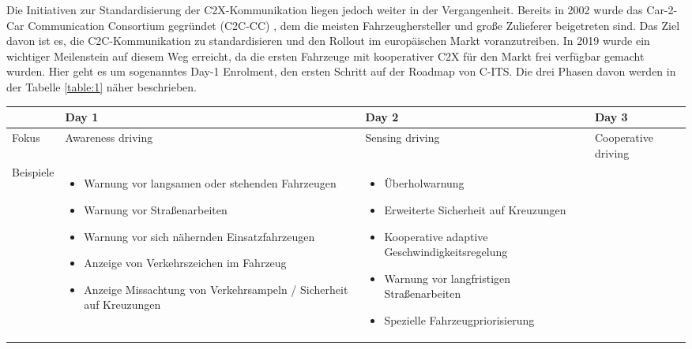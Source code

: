 Die Initiativen zur Standardisierung der C2X-Kommunikation liegen jedoch weiter in der Vergangenheit. Bereits in 2002 wurde das Car-2-Car Communication Consortium gegründet (C2C-CC)  \cite{Car2Car}, dem die meisten Fahrzeughersteller und große Zulieferer beigetreten sind. Das Ziel davon ist es, die C2C-Kommunikation zu standardisieren und den Rollout im europäischen Markt voranzutreiben. In 2019 wurde ein wichtiger Meilenstein auf diesem Weg erreicht, da die ersten Fahrzeuge mit kooperativer C2X für den Markt frei verfügbar gemacht wurden. Hier geht es um sogenanntes Day-1 Enrolment, den ersten Schritt auf der Roadmap von C-ITS. Die drei Phasen davon werden in der Tabelle \ref{table:1} näher beschrieben.

\begin{table}[h!]
	\centering
	\begin{tabular}{|m{4em}|m{10em}|m{10em}|m{8em}|} 
		\hline
		& Day 1 & Day 2 & Day 3 \\ [1ex]
		\hline
		Fokus & Awareness driving & Sensing driving & Cooperative driving \\ [1ex]
		\hline 
		Beispiele & \begin{itemize}[leftmargin=0.3cm] \item Warnung vor langsamen oder stehenden Fahrzeugen
		
		\item Warnung vor Straßenarbeiten
		
		\item Warnung vor sich nähernden Einsatzfahrzeugen
		
		\item Anzeige von Verkehrszeichen im Fahrzeug
		
		\item Anzeige Missachtung von Verkehrsampeln / Sicherheit auf Kreuzungen 
		
	\end{itemize} & 
	\begin{itemize}[leftmargin=0.3cm] \item Überholwarnung
	
	\item Erweiterte Sicherheit auf Kreuzungen 
	
	\item Kooperative adaptive Geschwindigkeitsregelung
	
	\item Warnung vor langfristigen Straßenarbeiten
	
	\item Spezielle Fahrzeugpriorisierung
	

\end{itemize}
\end{tabular}
\end{table}
